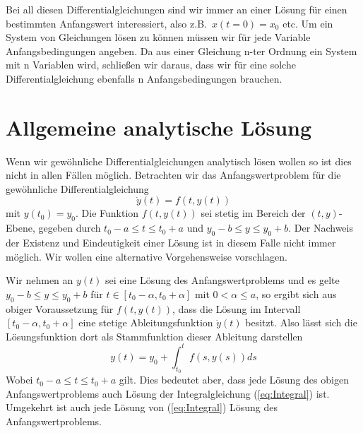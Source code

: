 Bei all diesen Differentialgleichungen sind wir immer an einer Lösung für
einen bestimmten Anfangswert interessiert, also z.B.\ $x(t=0)=x_0$ etc. Um ein
System von Gleichungen lösen zu können müssen wir für jede Variable
Anfangsbedingungen angeben. Da aus einer Gleichung n-ter Ordnung ein System mit
n Variablen wird, schließen wir daraus, dass wir für eine solche
Differentialgleichung ebenfalls n Anfangsbedingungen brauchen.
%
\section{Allgemeine analytische Lösung}\label{sec:analyticsolu}
Wenn wir gewöhnliche Differentialgleichungen analytisch lösen wollen so ist
dies nicht in allen Fällen möglich. Betrachten wir das Anfangswertproblem
für die gewöhnliche Differentialgleichung
\[ \dot{y}(t) = f\left(t,y(t)\right)\]
mit $y(t_0)=y_0$. Die Funktion $f(t,y(t))$ sei stetig im Bereich der
$(t,y)$-Ebene, gegeben durch $t_0-a\le t\le t_0+a$ und $y_0 -b\le y\le y_0+b$.
Der Nachweis der Existenz und Eindeutigkeit einer Lösung ist in diesem Falle
nicht immer möglich. Wir wollen eine alternative Vorgehensweise vorschlagen.

Wir nehmen an $y(t)$ sei eine Lösung des Anfangswertproblems und es gelte
$y_0 -b\le y\le y_0+b$ für $t\in [t_0-\alpha,t_0+\alpha]$ mit $0<\alpha\le a$,
so ergibt sich aus obiger Voraussetzung für $f(t,y(t))$, dass die Lösung im
Intervall $[t_0-\alpha,t_0+\alpha]$ eine stetige Ableitungsfunktion
$\dot{y}(t)$ besitzt.  Also lässt sich die Lösungsfunktion dort als
Stammfunktion dieser Ableitung darstellen 
\begin{equation}\label{eq:Integral}
  y(t)=y_0+\int_{t_0}^t f(s,y(s))ds 
\end{equation}
Wobei $t_0-a\le t\le t_0+a$ gilt. Dies bedeutet aber, dass jede Lösung des
obigen Anfangswertproblems auch Lösung der Integralgleichung
(\ref{eq:Integral}) ist. Umgekehrt ist auch jede Lösung von
(\ref{eq:Integral}) Lösung des Anfangswertproblems.
